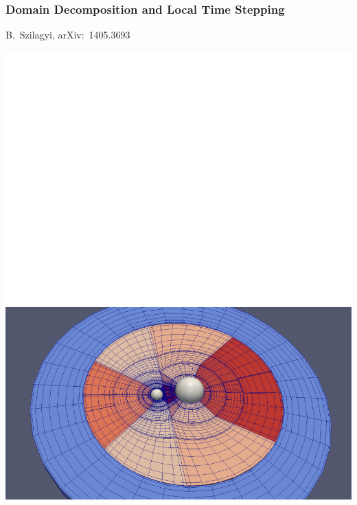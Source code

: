 \documentclass[svgnames,tikz,serif,ragged2e]{beamer}
\begin{document}
\begin{frame}
  \frametitle{Domain Decomposition and Local Time Stepping}
  B.~Szilagyi, arXiv:~1405.3693
  \vspace{-0.4cm}
  \begin{center}
    \includegraphics[height=.72\textheight]{CutSphere_SphereC0AndInterior}
  \end{center}
\end{frame}
\end{document}
